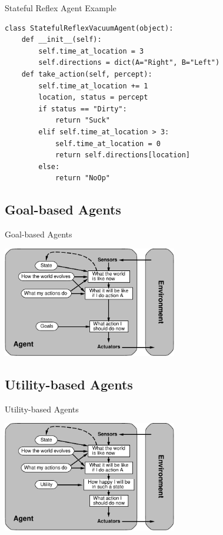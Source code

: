 \documentclass[14pt]{beamer}
\begin{document}
\begin{frame}[fragile]{Stateful Reflex Agent Example}
\footnotesize
\begin{lstlisting}
class StatefulReflexVacuumAgent(object):
    def __init__(self):
        self.time_at_location = 3
        self.directions = dict(A="Right", B="Left")
    def take_action(self, percept):
        self.time_at_location += 1
        location, status = percept
        if status == "Dirty":
            return "Suck"
        elif self.time_at_location > 3:
            self.time_at_location = 0
            return self.directions[location]
        else:
            return "NoOp"
\end{lstlisting}
\end{frame}


\subsection{Goal-based Agents}
\begin{frame}{Goal-based Agents}
\begin{center}
\includegraphics[width=3in]{goal-based-agent.pdf}
\end{center}
\end{frame}

\subsection{Utility-based Agents}
\begin{frame}{Utility-based Agents}
\begin{center}
\includegraphics[width=3in]{utility-based-agent.pdf}
\end{center}
\end{frame}
\end{document}
